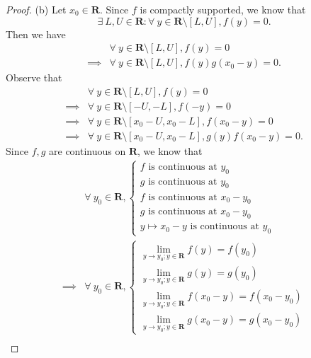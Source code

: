 \begin{proof}{(b)}
    Let \(x_0 \in \mathbf{R}\).
    Since \(f\) is compactly supported, we know that
    \[
        \exists\ L, U \in \mathbf{R} : \forall\ y \in \mathbf{R} \setminus [L, U], f(y) = 0.
    \]
    Then we have
    \begin{align*}
                 & \forall\ y \in \mathbf{R} \setminus [L, U], f(y) = 0             \\
        \implies & \forall\ y \in \mathbf{R} \setminus [L, U], f(y) g(x_0 - y) = 0.
    \end{align*}
    Observe that
    \begin{align*}
                 & \forall\ y \in \mathbf{R} \setminus [L, U], f(y) = 0                         \\
        \implies & \forall\ y \in \mathbf{R} \setminus [-U, -L], f(-y) = 0                      \\
        \implies & \forall\ y \in \mathbf{R} \setminus [x_0 - U, x_0 - L], f(x_0 - y) = 0       \\
        \implies & \forall\ y \in \mathbf{R} \setminus [x_0 - U, x_0 - L], g(y) f(x_0 - y) = 0.
    \end{align*}
    Since \(f, g\) are continuous on \(\mathbf{R}\), we know that
    \begin{align*}
                 & \forall\ y_0 \in \mathbf{R}, \begin{cases}
            f \text{ is continuous at } y_0       \\
            g \text{ is continuous at } y_0       \\
            f \text{ is continuous at } x_0 - y_0 \\
            g \text{ is continuous at } x_0 - y_0 \\
            y \mapsto x_0 - y \text{ is continuous at } y_0
        \end{cases} \\
        \implies & \forall\ y_0 \in \mathbf{R}, \begin{cases}
            \lim_{y \to y_0 ; y \in \mathbf{R}} f(y) = f(y_0)             \\
            \lim_{y \to y_0 ; y \in \mathbf{R}} g(y) = g(y_0)             \\
            \lim_{y \to y_0 ; y \in \mathbf{R}} f(x_0 - y) = f(x_0 - y_0) \\
            \lim_{y \to y_0 ; y \in \mathbf{R}} g(x_0 - y) = g(x_0 - y_0)
        \end{cases} \\

\end{align*}
\end{proof}
